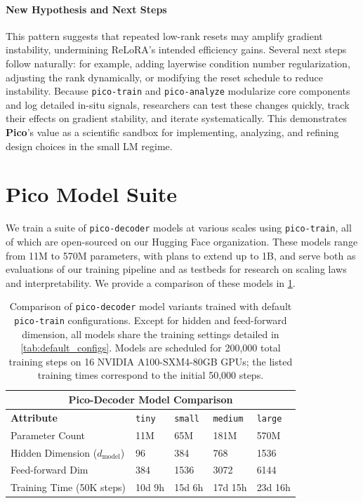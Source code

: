 
\paragraph{New Hypothesis and Next Steps}
This pattern suggests that repeated low-rank resets may amplify gradient instability, undermining ReLoRA's intended efficiency gains. Several next steps follow naturally: for example, adding layerwise condition number regularization, adjusting the rank dynamically, or modifying the reset schedule to reduce instability. Because \texttt{pico-train} and \texttt{pico-analyze} modularize core components and log detailed in-situ signals, researchers can test these changes quickly, track their effects on gradient stability, and iterate systematically. This demonstrates \textbf{Pico}'s value as a scientific sandbox for implementing, analyzing, and refining design choices in the small LM regime.


\section{Pico Model Suite}

We train a suite of \texttt{pico-decoder} models at various scales using \texttt{pico-train}, all of which are open-sourced on our Hugging Face organization. These models range from 11M to 570M parameters, with plans to extend up to 1B, and serve both as evaluations of our training pipeline and as testbeds for research on scaling laws and interpretability. We provide a comparison of these models in \cref{tab:pico-decoder-configs}.

\begin{table}[h!]
    \centering
    \renewcommand{\arraystretch}{1.2}
    \begin{tabular}{|p{}||p{}|p{}|p{}|p{}|}
    \hline
    \multicolumn{5}{|c|}{\textbf{Pico-Decoder Model Comparison}} \\
    \hline
    \textbf{Attribute} & \texttt{tiny} & \texttt{small} & \texttt{medium} & \texttt{large} \\
    \hline
    Parameter Count & 11M & 65M & 181M & 570M \\
    Hidden Dimension ($d_{\text{model}}$) & 96 & 384 & 768 & 1536 \\
    Feed-forward Dim & 384 & 1536 & 3072 & 6144 \\
    Training Time (50K steps) & 10d 9h & 15d 6h & 17d 15h & 23d 16h \\
    \hline
    \end{tabular}
    \vspace{0.5em}
    \caption{Comparison of \texttt{pico-decoder} model variants trained with default \texttt{pico-train} configurations. Except for hidden and feed-forward dimension, all models share the training settings detailed in \cref{tab:default_configs}. Models are scheduled for 200,000 total training steps on 16 NVIDIA A100-SXM4-80GB GPUs; the listed training times correspond to the initial 50,000 steps.}
    \label{tab:pico-decoder-configs}
    \end{table}

